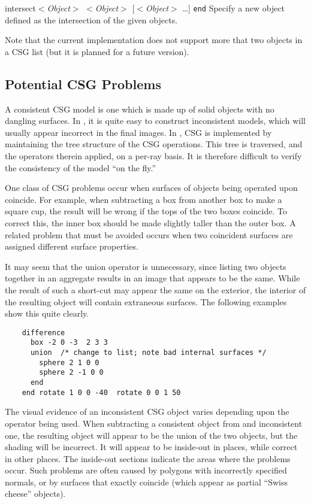 \begin{defkey}{intersect}{$<${\em Object}$>$ $<${\em Object}$>$
[$<${\em Object}$>$ \ldots] {\tt end}}
	Specify a new object defined as the intersection of the
	given objects.
\end{defkey}

Note that the current implementation does not support more that two
objects in a CSG list (but it is planned for a future version).

% 

\subsection{Potential CSG Problems}

A consistent CSG model is one which is made
up of solid objects with no dangling surfaces.  In {\rayshade},
it is quite easy to construct inconsistent models, which will usually
appear incorrect in the final images.
In {\rayshade}, CSG is implemented by maintaining
the tree structure of the CSG operations.  This tree is traversed,
and the operators therein applied, on a per-ray basis.
It is therefore difficult to verify the consistency of
the model ``on the fly.''

One class of CSG problems occur when
surfaces of objects being operated upon
coincide.  For example, when subtracting a box from another box to make a
square cup, the result will be wrong if the tops of the two boxes
coincide.  To correct this, the inner box should be made
slightly taller than the outer box.
A related problem that must be
avoided occurs when two coincident surfaces are assigned
different surface properties.

It may seem that the union operator is unnecessary, since
listing two objects together in an aggregate results
in an image that appears to be the same.
While the result of such a short-cut
may appear the same on the exterior, the interior
of the resulting object will contain
extraneous surfaces.
The following examples show this quite clearly.

\begin{verbatim}
    difference
      box -2 0 -3  2 3 3
      union  /* change to list; note bad internal surfaces */
        sphere 2 1 0 0
        sphere 2 -1 0 0
      end
    end rotate 1 0 0 -40  rotate 0 0 1 50
\end{verbatim}

The visual evidence of an inconsistent CSG object varies depending
upon the operator being used.
When subtracting a consistent object from and
inconsistent one, the resulting object will appear to be
the union of the two objects, but the shading will be incorrect.
It will appear to be inside-out in places, while correct
in other places.  The inside-out sections indicate the areas
where the problems occur.
Such problems are often caused by
polygons with incorrectly specified
normals, or by surfaces that exactly coincide (which
appear as partial ``Swiss cheese'' objects).

